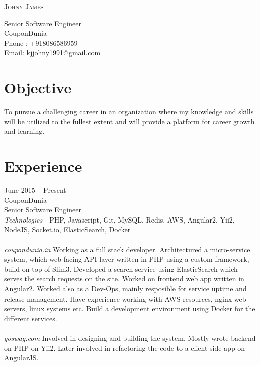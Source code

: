 \documentclass[a4paper]{article}
\begin{document}
\pagestyle{empty}
\begin{center}

\Large
\textsc{Johny James}%
\end{center}
\vspace{1.2\baselineskip}
\begin{flushleft}
    Senior Software Engineer \\
    CouponDunia \\
    Phone : +918086586959 \\
    Email: kjjohny1991@gmail.com \\
\end{flushleft}

\section{Objective}
\begin{flushleft}
    To pursue a challenging career in an organization where my knowledge and skills will be
    utilized to the fullest extent and will provide a platform for career growth and learning.
\end{flushleft}

\section{Experience}
\begin{CV}
\item[June 2015 -- Present]
    ~\\
    CouponDunia\\
    Senior Software Engineer\\
    \emph{Technologies} - PHP, Javascript, Git, MySQL, Redis, AWS, Angular2, Yii2, NodeJS, Socket.io, ElasticSearch, Docker \\\\
    \emph{coupondunia.in} Working as a full stack developer. Architectured a micro-service system, which web facing API layer
    written in PHP using a custom framework, build on top of Slim3. Developed a search service using ElasticSearch which serves 
    the search requests on the site. Worked on frontend web app written in Angular2. Worked also as a Dev-Ops, mainly resposible for
    service uptime and release management. Have experience working with AWS resources, nginx web servers, linux systems etc. Build a
    development environment using Docker for the different services.\\\\
    \emph{goswag.com} Involved in designing and building the system. Mostly wrote backend on PHP on Yii2. Later involved in refactoring 
    the code to a client side app on AngularJS.\\
\end{CV}
\end{document}
